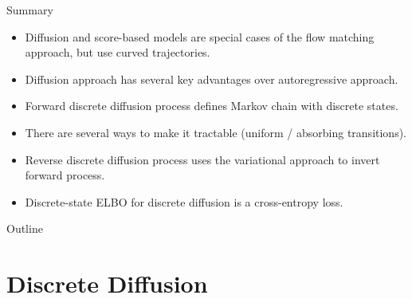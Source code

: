 \documentclass{beamer}
\begin{document}
\begin{frame}{Summary}
	\begin{itemize}
		\item Diffusion and score-based models are special cases of the flow matching approach, but use curved trajectories.
		\vfill
		\item Diffusion approach has several key advantages over autoregressive approach.
		\vfill
		\item Forward discrete diffusion process defines Markov chain with discrete states.
		\vfill
		\item There are several ways to make it tractable (uniform / absorbing transitions).
		\vfill
		\item Reverse discrete diffusion process uses the variational approach to invert forward process.
		\vfill 
		\item Discrete-state ELBO for discrete diffusion is a cross-entropy loss. 
	\end{itemize}
\end{frame}


\begin{frame}
\titlepage
	\resetonslide
\end{frame}






\begin{frame}{Outline}
	\tableofcontents
\end{frame}
\section{Discrete Diffusion}
\end{document}
